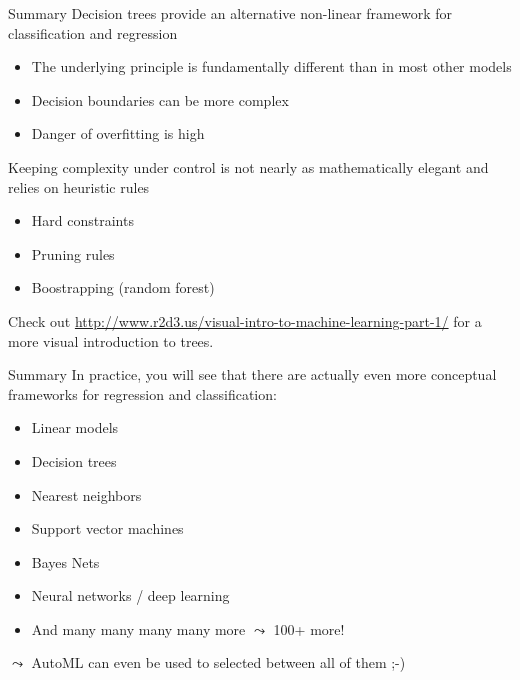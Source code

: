 \documentclass[aspectratio=169]{../latex_main/tntbeamer}  %
\begin{document}
	\begin{frame}{Summary}
	    Decision trees provide an alternative non-linear framework for classification and regression
	    \begin{itemize}
	        \item The underlying principle is fundamentally different than in most other models
	        \item Decision boundaries can be more complex
	        \item Danger of overfitting is high
	    \end{itemize}
	    \bigskip
	    Keeping complexity under control is not nearly as mathematically elegant and\\ relies on heuristic rules
	    \begin{itemize}
	        \item Hard constraints
	        \item Pruning rules
	        \item Boostrapping (random forest)
	    \end{itemize}
	    
	    Check out \url{http://www.r2d3.us/visual-intro-to-machine-learning-part-1/} for a more visual introduction to trees.
	    
	\end{frame}
	
	\begin{frame}{Summary}
	   In practice, you will see that there are actually even more conceptual frameworks for regression and classification:
	    \begin{itemize}
	        \item Linear models
	        \item Decision trees
	        \item Nearest neighbors
	        \item Support vector machines
	        \item Bayes Nets
            \item Neural networks / deep learning
	        \item And many many many many more $\leadsto$ 100+ more!
	    \end{itemize}
	    
	    \bigskip
	    
	    $\leadsto$ AutoML can even be used to selected between all of them ;-)
	\end{frame}
\end{document}
